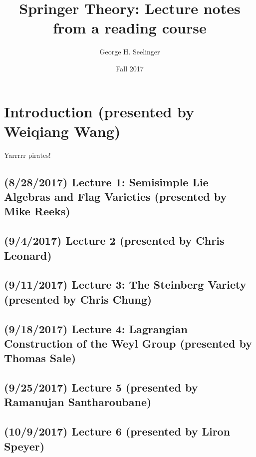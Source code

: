 \documentclass[11pt,leqno,oneside]{amsbook}
\title[Springer Theory]{Springer Theory: Lecture notes from a reading course}
\author{George H. Seelinger}
\date{Fall 2017}
\numberwithin{thm}{section}
\begin{document}
\maketitle
\pagebreak
\section{Introduction (presented by Weiqiang Wang)}
Yarrrrr pirates!
\subsection*{(8/28/2017) Lecture 1: Semisimple Lie Algebras and Flag Varieties (presented by Mike
  Reeks)}

\subsection*{(9/4/2017) Lecture 2 (presented by Chris Leonard)}

\subsection*{(9/11/2017) Lecture 3: The Steinberg Variety (presented
  by Chris Chung)}

\subsection*{(9/18/2017) Lecture 4: Lagrangian Construction of the
  Weyl Group (presented by Thomas Sale)}

\subsection*{(9/25/2017) Lecture 5 (presented by Ramanujan
  Santharoubane)}

\subsection*{(10/9/2017) Lecture 6 (presented by Liron Speyer)}
\end{document}
